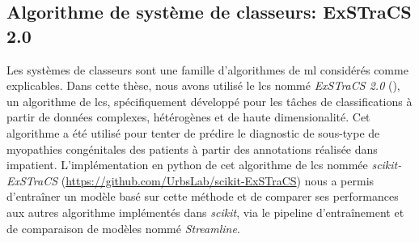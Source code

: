 \subsection{Algorithme de système de classeurs: ExSTraCS 2.0}
Les systèmes de classeurs sont une famille d'algorithmes de \gls{ml} considérés comme explicables. Dans cette thèse, nous avons utilisé le \gls{lcs} nommé \textit{ExSTraCS 2.0} (\cite{urbanowicz_exstracs_2015}), un algorithme de \gls{lcs}, spécifiquement développé pour les tâches de classifications à partir de données complexes, hétérogènes et de haute dimensionalité. Cet algorithme a été utilisé pour tenter de prédire le diagnostic de sous-type de myopathies congénitales des patients à partir des annotations réalisée dans \gls{impatient}. L'implémentation en python de cet algorithme de \gls{lcs} nommée \textit{scikit-ExSTraCS} (\href{https://github.com/UrbsLab/scikit-ExSTraCS}{https://github.com/UrbsLab/scikit-ExSTraCS}) nous a permis d'entraîner un modèle basé sur cette méthode et de comparer ses performances aux autres algorithme implémentés dans \textit{scikit}, via le pipeline d'entraînement et de comparaison de modèles nommé \textit{Streamline}.

